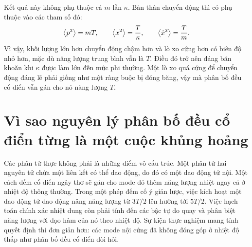 Kết quả này không phụ thuộc cả \(m\) lẫn \(\kappa\). Bản thân chuyển động thì có phụ thuộc vào các tham số đó:
\begin{equation}
 \left\langle p^2\right\rangle=mT,
 \qquad
 \left\langle x^2\right\rangle=\frac{T}{\kappa},
 \qquad
 \left\langle\dot{x}^2\right\rangle=\frac{T}{m}.
 \label{eq:sm7-classical-fluctuations}
\end{equation}
Vì vậy, khối lượng lớn hơn chuyển động chậm hơn và lò xo cứng hơn có biên độ nhỏ hơn, mặc dù năng lượng trung bình vẫn là \(T\).
Điều đó trở nên đáng băn khoăn khi \(\kappa\) được làm lớn đến mức phi thường. Một lò xo quá cứng để chuyển động đáng lẽ phải giống như một ràng buộc bị đóng băng, vậy mà phân bố đều cổ điển vẫn gán cho nó năng lượng \(T\).

\begin{classroomqa}
\end{classroomqa}

\begin{classroomqa}
\end{classroomqa}

\section{Vì sao nguyên lý phân bố đều cổ điển từng là một cuộc khủng hoảng}

Các phân tử thực không phải là những điểm vô cấu trúc. Một phân tử hai nguyên tử chứa một liên kết có thể dao động, do đó có một dao động tử nội. Một cách đếm cổ điển ngây thơ sẽ gán cho mode đó thêm năng lượng nhiệt ngay cả ở nhiệt độ thông thường. Trong một phép đếm cố ý giản lược, việc kích hoạt một dao động tử dao động nâng năng lượng từ \(3T/2\) lên hướng tới \(5T/2\). Việc hạch toán chính xác nhiệt dung còn phải tính đến các bậc tự do quay và phân biệt năng lượng với đạo hàm của nó theo nhiệt độ. Sự kiện thực nghiệm mang tính quyết định thì đơn giản hơn:
các mode nội cứng đã không đóng góp ở nhiệt độ thấp như phân bố đều cổ điển đòi hỏi.

